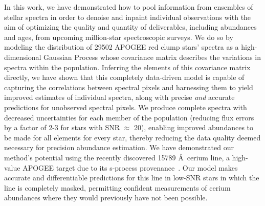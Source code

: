 \documentclass[a4paper,fleqn,usenatbib]{mnras}
\begin{document}
In this work, we have demonstrated how to pool information from ensembles of stellar spectra in order to denoise and inpaint individual observations with the aim of optimizing the quality and quantity of deliverables, including abundances and ages, from upcoming million-star spectroscopic surveys. We do so by modeling the distribution of 29502 APOGEE red clump stars' spectra as a high-dimensional Gaussian Process whose covariance matrix describes the variations in spectra within the population. Inferring the elements of this covariance matrix directly, we have shown that this completely data-driven model is capable of capturing the correlations between spectral pixels and harnessing them to yield improved estimates of individual spectra, along with precise {\it and} accurate predictions for unobserved spectral pixels. We produce complete spectra with decreased uncertainties for each member of the population (reducing flux errors by a factor of 2-3 for stars with SNR $\approx$ 20), enabling improved abundances to be made for all elements for every star, thereby reducing the data quality deemed necessary for precision abundance estimation. We have demonstrated our method's potential using the recently discovered 15789 \AA\ cerium line, a high-value APOGEE target due to its s-process provenance~\citep{Cunha2017}. Our model makes accurate and differentiable predictions for this line in low-SNR stars in which the line is completely masked, permitting confident measurements of cerium abundances where they would previously have not been possible.

\end{document}
